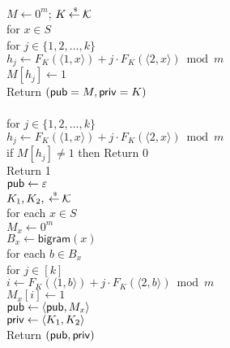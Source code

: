 \begin{figure}[tp]
\centering
{}
{
\\
$M \gets 0^m$; $K {\:\stackrel{{\scriptscriptstyle \hspace{0.2em}\$}} {\leftarrow}\:} {\cal K}$\\
for $x \in S$\\
\nudge for $j \in \{1,2,\ldots,k\}$\\
\nudge\nudge $h_j \gets F_{K}(\langle 1,x \rangle) + j\cdot F_{K}(\langle 2,x \rangle) \bmod m$\\
\nudge\nudge $M[h_j] \gets 1$\\
Return $({\sf pub}=M,{\sf priv}=K)$\\

\medskip
{}\\
for $j \in \{1,2,\ldots,k\}$\\
\nudge $h_j \gets F_{K}(\langle 1,x \rangle) + j\cdot F_{K}(\langle 2,x\rangle) \bmod m$\\
\nudge if $M[h_j] \neq 1$ then Return 0\\
Return 1
}
{
\\
${\sf pub} \gets \varepsilon$\\
$K_1,K_2, {\:\stackrel{{\scriptscriptstyle \hspace{0.2em}\$}} {\leftarrow}\:} {\cal K}$\\
for each $x \in S$\\
\nudge $M_x \gets 0^m$\\
\nudge $B_x \gets \mathsf{bigram}(x)$\\
\nudge for each $b \in B_x$\\
\nudge\nudge for $j \in [k]$\\
\nudge\nudge\nudge $i \gets F_{K}(\langle 1, b\rangle)+j\cdot
F_{K}(\langle 2, b  \rangle) \bmod m$\\
\nudge\nudge\nudge $M_x[i] \gets 1$\\
\nudge ${\sf pub} \gets \langle{\sf pub}, M_x \rangle$\\
${\sf priv} \gets \langle K_1,K_2 \rangle$\\
Return $({\sf pub},{\sf priv})$\\

}
\end{figure}
